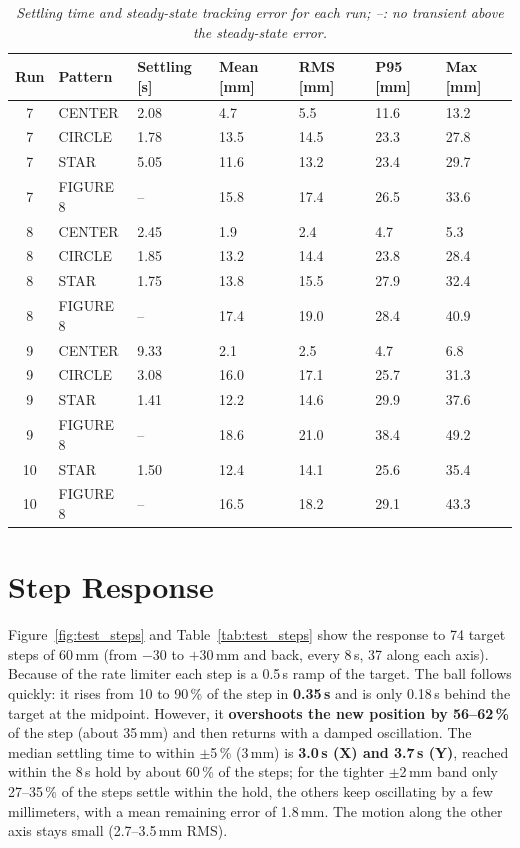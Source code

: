 \documentclass[12pt,a4paper]{report}
\begin{document}
\begin{table}[H]
\centering
\begin{tabularx}{\textwidth}{|c|l|X|X|X|X|X|}
\hline
\textbf{Run} & \textbf{Pattern} & \textbf{Settling [s]} & \textbf{Mean [mm]} & \textbf{RMS [mm]} & \textbf{P95 [mm]} & \textbf{Max [mm]} \\ \hline
7 & CENTER & 2.08 & 4.7 & 5.5 & 11.6 & 13.2 \\ \hline
7 & CIRCLE & 1.78 & 13.5 & 14.5 & 23.3 & 27.8 \\ \hline
7 & STAR & 5.05 & 11.6 & 13.2 & 23.4 & 29.7 \\ \hline
7 & FIGURE 8 & -- & 15.8 & 17.4 & 26.5 & 33.6 \\ \hline
8 & CENTER & 2.45 & 1.9 & 2.4 & 4.7 & 5.3 \\ \hline
8 & CIRCLE & 1.85 & 13.2 & 14.4 & 23.8 & 28.4 \\ \hline
8 & STAR & 1.75 & 13.8 & 15.5 & 27.9 & 32.4 \\ \hline
8 & FIGURE 8 & -- & 17.4 & 19.0 & 28.4 & 40.9 \\ \hline
9 & CENTER & 9.33 & 2.1 & 2.5 & 4.7 & 6.8 \\ \hline
9 & CIRCLE & 3.08 & 16.0 & 17.1 & 25.7 & 31.3 \\ \hline
9 & STAR & 1.41 & 12.2 & 14.6 & 29.9 & 37.6 \\ \hline
9 & FIGURE 8 & -- & 18.6 & 21.0 & 38.4 & 49.2 \\ \hline
10 & STAR & 1.50 & 12.4 & 14.1 & 25.6 & 35.4 \\ \hline
10 & FIGURE 8 & -- & 16.5 & 18.2 & 29.1 & 43.3 \\ \hline
\end{tabularx}
\caption{\textit{Settling time and steady-state tracking error for each run; --: no transient above the steady-state error.}}
\label{tab:per_run}
\end{table}

\section{Step Response}
\label{sec:exp_steps}

Figure~\ref{fig:test_steps} and Table~\ref{tab:test_steps} show the response to 74 target steps of 60\,mm (from $-30$ to $+30$\,mm and back, every 8\,s, 37 along each axis). Because of the rate limiter each step is a 0.5\,s ramp of the target. The ball follows quickly: it rises from 10 to 90\,\% of the step in \textbf{0.35\,s} and is only 0.18\,s behind the target at the midpoint. However, it \textbf{overshoots the new position by 56--62\,\%} of the step (about 35\,mm) and then returns with a damped oscillation. The median settling time to within $\pm$5\,\% (3\,mm) is \textbf{3.0\,s (X) and 3.7\,s (Y)}, reached within the 8\,s hold by about 60\,\% of the steps; for the tighter $\pm$2\,mm band only 27--35\,\% of the steps settle within the hold, the others keep oscillating by a few millimeters, with a mean remaining error of 1.8\,mm. The motion along the other axis stays small (2.7--3.5\,mm RMS).
\end{document}
